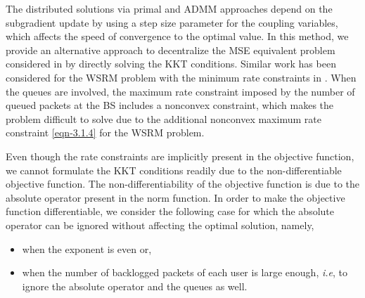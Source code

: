 
The distributed solutions via primal and \ac{ADMM} approaches depend on the subgradient update by using a step size parameter for the coupling variables, which affects the speed of convergence to the optimal value. In this method, we provide an alternative approach to decentralize the \ac{MSE} equivalent problem considered in \cite{christensen2008weighted,wmmse_shi} by directly solving the \ac{KKT} conditions. Similar work has been considered for the \ac{WSRM} problem with the minimum rate constraints in \cite{kaleva2013decentralized,kaleva2013primal}. When the queues are involved, the maximum rate constraint imposed by the number of queued packets at the \ac{BS} includes a nonconvex constraint, which makes the problem difficult to solve due to the additional nonconvex maximum rate constraint \eqref{eqn-3.1.4} for the \ac{WSRM} problem.

Even though the rate constraints are implicitly present in the objective function, we cannot formulate the \ac{KKT} conditions readily due to the non-differentiable objective function. The non-differentiability of the objective function is due to the absolute operator present in the norm function. In order to make the objective function differentiable, we consider the following case for which the absolute operator can be ignored without affecting the optimal solution, namely,
\begin{itemize}
\item when the exponent  is even or,
\item when the number of backlogged packets of each user is large enough, \textit{i.e},  to ignore the absolute operator and the queues as well.
\end{itemize}

